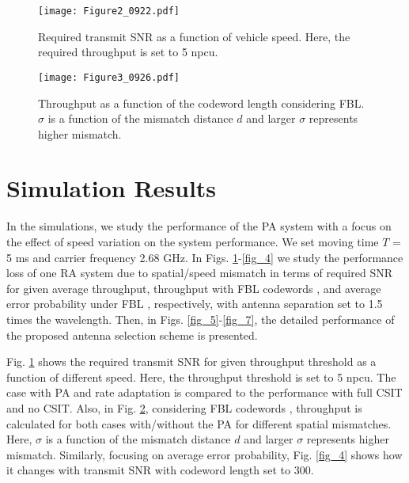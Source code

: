 \documentclass[conference]{IEEEtran}
\begin{document}
\begin{figure}
\centering
  \texttt{[image: Figure2\_0922.pdf]}\\
\caption{Required transmit \ac{SNR} as a function of vehicle speed. Here, the required throughput is set to 5 \ac{npcu}.}
\label{fig_2}
\end{figure}

\begin{figure}
\centering
  \texttt{[image: Figure3\_0926.pdf]}\\
\caption{Throughput as a function of the codeword length considering \ac{FBL}. $\sigma$ is a function of the mismatch distance $d$ and larger $\sigma$ represents higher mismatch. }
\label{fig_3}
\end{figure}

\section{Simulation Results}
In the simulations, we study the performance of the \ac{PA} system with a focus on the effect of speed variation on the system performance. We set moving time $T$ = 5 ms and carrier frequency 2.68 GHz.  In Figs. \ref{fig_2}-\ref{fig_4} we study the performance loss of one \ac{RA} system due to spatial/speed mismatch in terms of required \ac{SNR} for given average throughput, throughput with \ac{FBL} codewords \cite{guo2020comnet}, and average error probability under \ac{FBL} \cite{guo2020comnet}, respectively, with antenna separation set to 1.5 times the wavelength. Then, in Figs. \ref{fig_5}-\ref{fig_7}, the detailed performance of the proposed antenna selection scheme is presented. 

Fig. \ref{fig_2} shows the required transmit \ac{SNR} for given throughput threshold as a function of different speed. Here, the throughput threshold is set to 5 \ac{npcu}. The case with \ac{PA} and rate adaptation is compared to the performance with full \ac{CSIT} and no \ac{CSIT}. Also, in Fig. \ref{fig_3}, considering \ac{FBL} codewords \cite{guo2020comnet}, throughput is calculated for both cases with/without the \ac{PA} for different spatial mismatches. Here, $\sigma$ is a function of the mismatch distance $d$ and larger $\sigma$ represents higher mismatch. Similarly, focusing on average error probability, Fig. \ref{fig_4} shows how it changes with transmit SNR with codeword length set to 300.
\end{document}
